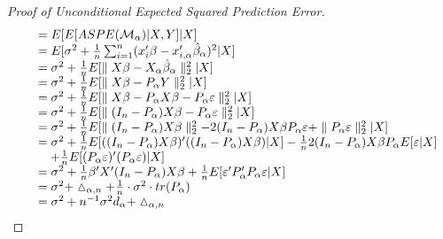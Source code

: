 \documentclass[Research_Module_ES.tex]{subfiles}
\begin{document}
\begin{proof}[Proof of Unconditional Expected Squared Prediction Error]
\begin{align*}
\begin{tabular}{ll}
	&$=E[E[ASPE(\mathcal{M}_\alpha)|X,Y]|X]$\\
	&$=E[\sigma^2+\frac{1}{n}\sum_{i=1}^{n}(x_i^\prime\beta-x_{i,\alpha}^\prime\hat{\beta}_\alpha)^2|X]$\\
	&$=\sigma^2+\frac{1}{n}E[\parallel X\beta-X_\alpha\hat{\beta}_\alpha\parallel_2^2|X]$\\
	&$=\sigma^2+\frac{1}{n}E[\parallel X\beta-P_\alpha Y\parallel_2^2|X]$\\
	&$=\sigma^2+\frac{1}{n}E[\parallel X\beta-P_\alpha X\beta-P_\alpha\varepsilon\parallel_2^2|X]$\\
	&$=\sigma^2+\frac{1}{n}E[\parallel (I_n-P_\alpha)X\beta-P_\alpha\varepsilon\parallel_2^2|X]$\\
	&$=\sigma^2+\frac{1}{n}E[\parallel (I_n-P_\alpha)X\beta\parallel_2^2-2(I_n-P_\alpha)X\beta P_\alpha\varepsilon+\parallel P_\alpha\varepsilon\parallel_2^2|X]$\\
	&$=\sigma^2+\frac{1}{n}E[((I_n-P_\alpha)X\beta)^\prime((I_n-P_\alpha)X\beta)|X]-\frac{1}{n}2(I_n-P_\alpha)X\beta P_\alpha E[\varepsilon|X]$\\
	&$~~~+\frac{1}{n}E[(P_\alpha\varepsilon)^\prime (P_\alpha\varepsilon)|X]$\\
	&$=\sigma^2+\frac{1}{n}\beta^\prime X^\prime (I_n-P_\alpha)X\beta+\frac{1}{n}E[\varepsilon^\prime P_\alpha^\prime P_\alpha\varepsilon|X]$\\
	&$=\sigma^2+\vartriangle_{\alpha,n}+\frac{1}{n}\cdot\sigma^2\cdot tr(P_\alpha)$\\
	&$=\sigma^2+n^{-1}\sigma^2d_\alpha+\vartriangle_{\alpha,n}$
	\end{tabular}
	\end{align*}
\end{proof}	
\end{document}

